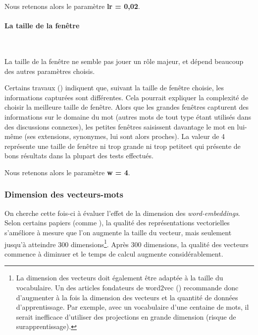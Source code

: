 \documentclass[11pt,french,french]{article}
\let\rmarkdownfootnote\footnote%
\def\footnote{\protect\rmarkdownfootnote}
\begin{document}
\faArrowCircleRight{} Nous retenons alors le paramètre \textbf{lr = 0,02}.

\hypertarget{la-taille-de-la-fenuxeatre}{%
\paragraph{La taille de la fenêtre}\label{la-taille-de-la-fenuxeatre}}

~

La taille de la fenêtre ne semble pas jouer un rôle majeur, et dépend beaucoup des autres paramètres choisis.

Certains travaux (\cite{Levy2}) indiquent que, suivant la taille de fenêtre choisie, les informations capturées sont différentes. Cela pourrait expliquer la complexité de choisir la \og meilleure \fg taille de fenêtre. Alors que les \og grandes \fg fenêtres capturent des informations sur le domaine du mot (autres mots de tout type étant utilisés dans des discussions connexes), les \og petites \fg fenêtres saisissent davantage le mot en lui-même (ses extensions, synonymes, lui sont alors proches). La valeur de 4 représente une taille de fenêtre \og ni trop grande ni trop petite\fg et qui présente de bons résultats dans la plupart des tests effectués.

\faArrowCircleRight{} Nous retenons alors le paramètre \textbf{w = 4}.

\hypertarget{dimension-des-vecteurs-mots}{%
\subsubsection{Dimension des vecteurs-mots}\label{dimension-des-vecteurs-mots}}

On cherche cette fois-ci à évaluer l'effet de la dimension des \emph{word-embeddings}.
Selon certains papiers (comme \cite{Pennington}), la qualité des représentations vectorielles s'améliore à mesure que l'on augmente la taille du vecteur, mais seulement jusqu'à atteindre 300 dimensions\footnote{La dimension des vecteurs doit également être adaptée à la taille du vocabulaire.
  Un des articles fondateurs de word2vec (\cite{Mikolov}) recommande donc d'augmenter à la fois la dimension des vecteurs et la quantité de données d'apprentissage.
  Par exemple, avec un vocabulaire d'une centaine de mots, il serait inefficace d'utiliser des projections en grande dimension (risque de surapprentissage).}.
Après 300 dimensions, la qualité des vecteurs commence à diminuer et le temps de calcul augmente considérablement.
\end{document}
